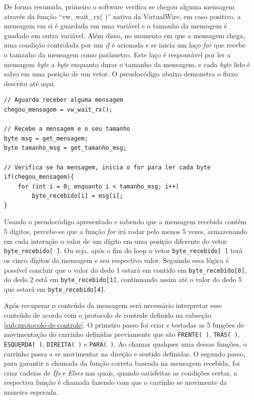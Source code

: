 \documentclass[
	12pt,				%
	openright,			%
	oneside,			%
	a4paper,			%
	english,			%
	brazil				%
	]{abntex2}
\begin{document}
		De forma resumida, primeiro o software verifica se chegou alguma mensagem através da função ``vw\_wait\_rx( )'' nativa da VirtualWire, em caso positivo, a mensagem em si é guardada em uma variável e o tamanho da mensagem é guadado em outra variável. Além disso, no momento em que a mensagem chega, uma condição controlada por um \textit{if} é acionada e se inicia um laço \textit{for} que recebe o tamanho da mensagem como parâmetro. Este laço é responsável por ler a mensagem \textit{byte} a \textit{byte} enquanto durar o tamanho da mensagem, e cada \textit{byte} lido é salvo em uma posição de um vetor. O pseudocódigo abaixo demonstra o fluxo descrito até aqui.
\begin{lstlisting}
// Aguarda receber alguma mensagem
chegou_mensagem = vw_wait_rx();

// Recebe a mensagem e o seu tamanho
byte msg = get_mensagem;
byte tamanho_msg = get_tamanho_msg;
	
// Verifica se ha mensagem, inicia o for para ler cada byte
if(chegou_mensagem){
	for (int i = 0; enquanto i < tamanho_msg; i++)
		byte_recebido[i] = msg[i];		
}
\end{lstlisting}

		Usando o pseudocódigo apresentado e sabendo que a mensagem recebida contém 5 dígitos, percebe-se que a função \textit{for} irá rodar pelo menos 5 vezes, armazenando em cada interação o valor de um dígito em uma posição diferente do vetor \texttt{byte\_recebido[ ]}. Ou seja, após o fim do loop o vetor \texttt{byte\_recebido[ ]} terá os cinco dígitos da mensagem e seu respectivo valor. Seguindo essa lógica é possível concluir que o valor do dedo 1 estará em contido em \texttt{byte\_recebido[0]}, do dedo 2 está em \texttt{byte\_recebido[1]}, continuando assim até o valor do dedo 5 que estará em \texttt{byte\_recebido[4]}.
		
		Após recuperar o conteúdo da mensagem será necessário interpretar esse conteúdo de acordo com o protocolo de controle definido na subseção \ref{sub:protocolo-de-controle}. O primeiro passo foi criar e testadas as 5 funções de movimentação do carrinho definidas previamente que são \texttt{FRENTE( )}, \texttt{TRAS( )}, \texttt{ESQUERDA( )}, \texttt{DIREITA( )} e \texttt{PARA( )}. Ao chamar qualquer uma dessas funções, o carrinho passa a se movimentar na direção e sentido definidas. O segundo passo, para garantir a chamada da função correta baseada na mensagem recebida, foi criar cadeias de \textit{Ifs} e \textit{Elses} nas quais, quando satisfeitas as condições certas, a respectiva função é chamada fazendo com que o carrinho se movimente da maneira esperada. 
		
\end{document}
